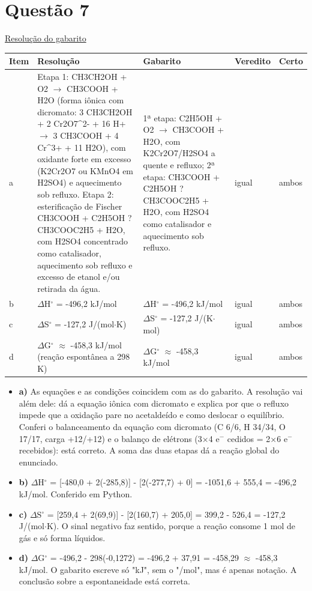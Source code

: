 \documentclass{article}%
\begin{document}
\section*{Questão 7}%
\href{https://poliedroresolve.sistemapoliedro.com.br/vestibulares/ita/2027/ita-2-fase-dia-2-21-10-2026-2-fase-dia-2/dissertativa-7-quimica-2-fase-dia-2-ita-2027}{Resolução do gabarito}\par\smallskip%
\begin{longtable}{@{}p{} p{} p{} p{} p{}@{}}\toprule Item & Resolução & Gabarito & Veredito & Certo \\ \midrule
a & Etapa 1: CH3CH2OH + O2 $\to$ CH3COOH + H2O (forma iônica com dicromato: 3 CH3CH2OH + 2 Cr2O7\^{}2{-} + 16 H+ $\to$ 3 CH3COOH + 4 Cr\^{}3+ + 11 H2O), com oxidante forte em excesso (K2Cr2O7 ou KMnO4 em H2SO4) e aquecimento sob refluxo. Etapa 2: esterificação de Fischer CH3COOH + C2H5OH ? CH3COOC2H5 + H2O, com H2SO4 concentrado como catalisador, aquecimento sob refluxo e excesso de etanol e/ou retirada da água. & 1ª etapa: C2H5OH + O2 $\to$ CH3COOH + H2O, com K2Cr2O7/H2SO4 a quente e refluxo; 2ª etapa: CH3COOH + C2H5OH ? CH3COOC2H5 + H2O, com H2SO4 como catalisador e aquecimento sob refluxo. & igual & ambos \\
b & $\Delta$H$^\circ$ = -496,2 kJ/mol & $\Delta$H$^\circ$ = -496,2 kJ/mol & igual & ambos \\
c & $\Delta$S$^\circ$ = -127,2 J/(mol$\cdot$K) & $\Delta$S$^\circ$ = -127,2 J/(K$\cdot$mol) & igual & ambos \\
d & $\Delta$G$^\circ$ $\approx$ -458,3 kJ/mol (reação espontânea a 298 K) & $\Delta$G$^\circ$ $\approx$ -458,3 kJ/mol & igual & ambos \\
\bottomrule\end{longtable}%
\begin{itemize}%
\item%
\textbf{a)} As equações e as condições coincidem com as do gabarito. A resolução vai além dele: dá a equação iônica com dicromato e explica por que o refluxo impede que a oxidação pare no acetaldeído e como deslocar o equilíbrio. Conferi o balanceamento da equação com dicromato (C 6/6, H 34/34, O 17/17, carga +12/+12) e o balanço de elétrons (3$\times$4 e$^{-}$ cedidos = 2$\times$6 e$^{-}$ recebidos): está correto. A soma das duas etapas dá a reação global do enunciado.%
\item%
\textbf{b)} $\Delta$H$^\circ$ = {[}-480,0 + 2(-285,8){]} - {[}2(-277,7) + 0{]} = -1051,6 + 555,4 = -496,2 kJ/mol. Conferido em Python.%
\item%
\textbf{c)} $\Delta$S$^\circ$ = {[}259,4 + 2(69,9){]} - {[}2(160,7) + 205,0{]} = 399,2 - 526,4 = -127,2 J/(mol$\cdot$K). O sinal negativo faz sentido, porque a reação consome 1 mol de gás e só forma líquidos.%
\item%
\textbf{d)} $\Delta$G$^\circ$ = -496,2 - 298(-0,1272) = -496,2 + 37,91 = -458,29 $\approx$ -458,3 kJ/mol. O gabarito escreve só "kJ", sem o "/mol", mas é apenas notação. A conclusão sobre a espontaneidade está correta.%
\end{itemize}%
\end{document}
